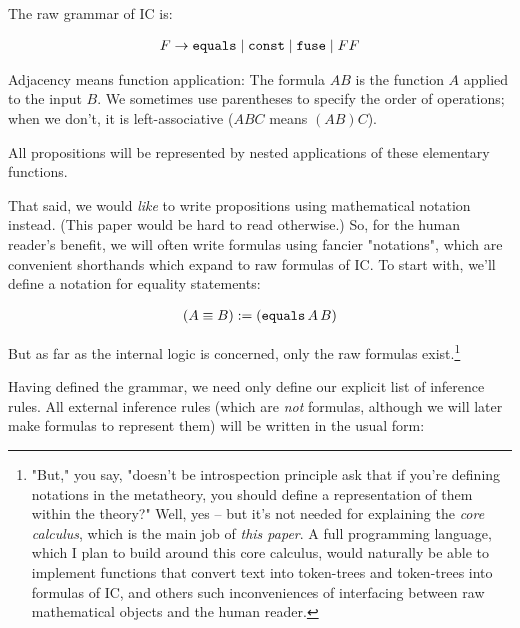 \documentclass{article}
\begin{document}
  
  The raw grammar of IC is:
  
  \begin{align*}
    F &\to \operatorname{\texttt{equals}} \mid \operatorname{\texttt{const}} \mid \operatorname{\texttt{fuse}} \mid FF \\
  \end{align*}
  
  Adjacency means function application: The formula $AB$ is the function $A$ applied to the input $B$. We sometimes use parentheses to specify the order of operations; when we don't, it is left-associative ($ABC$ means $(AB)C$).
  
  All propositions will be represented by nested applications of these elementary functions.
  
  That said, we would \emph{like} to write propositions using mathematical notation instead.
  (This paper would be hard to read otherwise.)
  So, for the human reader's benefit, we will often write formulas using fancier "notations", which are convenient shorthands which expand to raw formulas of IC.
  To start with, we'll define a notation for equality statements:
  
  \begin{align*}
    (A \equiv B) &:= (\operatorname{\texttt{equals}} A\, B)\\
  \end{align*}
  
  But as far as the internal logic is concerned, only the raw formulas exist.\footnote{"But," you say, "doesn't be introspection principle ask that if you're defining notations in the metatheory, you should define a representation of them within the theory?" Well, yes – but it's not needed for explaining the \emph{core calculus}, which is the main job of \emph{this paper}. A full programming language, which I plan to build around this core calculus, would naturally be able to implement functions that convert text into token-trees and token-trees into formulas of IC, and others such inconveniences of interfacing between raw mathematical objects and the human reader.}  
  
  Having defined the grammar, we need only define our explicit list of inference rules. 
  All external inference rules (which are \emph{not} formulas, although we will later make formulas to represent them) will be written in the usual form:
  
\end{document}

